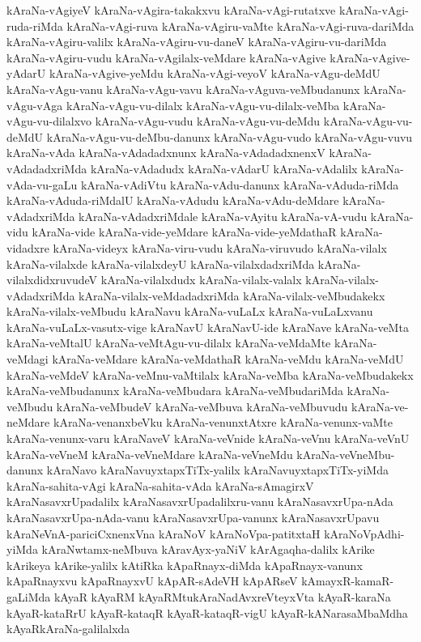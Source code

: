 {kAraNa-vAgiyeV
kAraNa-vAgira-takakxvu
kAraNa-vAgi-rutatxve
kAraNa-vAgi-ruda-riMda
kAraNa-vAgi-ruva
kAraNa-vAgiru-vaMte
kAraNa-vAgi-ruva-dariMda
kAraNa-vAgiru-valilx
kAraNa-vAgiru-vu-daneV
kAraNa-vAgiru-vu-dariMda
kAraNa-vAgiru-vudu
kAraNa-vAgilalx-veMdare
kAraNa-vAgive
kAraNa-vAgive-yAdarU
kAraNa-vAgive-yeMdu
kAraNa-vAgi-veyoV
kAraNa-vAgu-deMdU
kAraNa-vAgu-vanu
kAraNa-vAgu-vavu
kAraNa-vAguva-veMbudanunx
kAraNa-vAgu-vAga
kAraNa-vAgu-vu-dilalx
kAraNa-vAgu-vu-dilalx-veMba
kAraNa-vAgu-vu-dilalxvo
kAraNa-vAgu-vudu
kAraNa-vAgu-vu-deMdu
kAraNa-vAgu-vu-deMdU
kAraNa-vAgu-vu-deMbu-danunx
kAraNa-vAgu-vudo
kAraNa-vAgu-vuvu
kAraNa-vAda
kAraNa-vAdadadxnunx
kAraNa-vAdadadxnenxV
kAraNa-vAdadadxriMda
kAraNa-vAdadudx
kAraNa-vAdarU
kAraNa-vAdalilx
kAraNa-vAda-vu-gaLu
kAraNa-vAdiVtu
kAraNa-vAdu-danunx
kAraNa-vAduda-riMda
kAraNa-vAduda-riMdalU
kAraNa-vAdudu
kAraNa-vAdu-deMdare
kAraNa-vAdadxriMda
kAraNa-vAdadxriMdale
kAraNa-vAyitu
kAraNa-vA-vudu
kAraNa-vidu
kAraNa-vide
kAraNa-vide-yeMdare
kAraNa-vide-yeMdathaR
kAraNa-vidadxre
kAraNa-videyx
kAraNa-viru-vudu
kAraNa-viruvudo
kAraNa-vilalx
kAraNa-vilalxde
kAraNa-vilalxdeyU
kAraNa-vilalxdadxriMda
kAraNa-vilalxdidxruvudeV
kAraNa-vilalxdudx
kAraNa-vilalx-valalx
kAraNa-vilalx-vAdadxriMda
kAraNa-vilalx-veMdadadxriMda
kAraNa-vilalx-veMbudakekx
kAraNa-vilalx-veMbudu
kAraNavu
kAraNa-vuLaLx
kAraNa-vuLaLxvanu
kAraNa-vuLaLx-vasutx-vige
kAraNavU
kAraNavU-ide
kAraNave
kAraNa-veMta
kAraNa-veMtalU
kAraNa-veMtAgu-vu-dilalx
kAraNa-veMdaMte
kAraNa-veMdagi
kAraNa-veMdare
kAraNa-veMdathaR
kAraNa-veMdu
kAraNa-veMdU
kAraNa-veMdeV
kAraNa-veMnu-vaMtilalx
kAraNa-veMba
kAraNa-veMbudakekx
kAraNa-veMbudanunx
kAraNa-veMbudara
kAraNa-veMbudariMda
kAraNa-veMbudu
kAraNa-veMbudeV
kAraNa-veMbuva
kAraNa-veMbuvudu
kAraNa-ve-neMdare
kAraNa-venanxbeVku
kAraNa-venunxtAtxre
kAraNa-venunx-vaMte
kAraNa-venunx-varu
kAraNaveV
kAraNa-veVnide
kAraNa-veVnu
kAraNa-veVnU
kAraNa-veVneM
kAraNa-veVneMdare
kAraNa-veVneMdu
kAraNa-veVneMbu-danunx
kAraNavo
kAraNavuyxtapxTiTx-yalilx
kAraNavuyxtapxTiTx-yiMda
kAraNa-sahita-vAgi
kAraNa-sahita-vAda
kAraNa-sAmagirxV
kAraNasavxrUpadalilx
kAraNasavxrUpadalilxru-vanu
kAraNasavxrUpa-nAda
kAraNasavxrUpa-nAda-vanu
kAraNasavxrUpa-vanunx
kAraNasavxrUpavu
kAraNeVnA-pariciCxnenxVna
kAraNoV
kAraNoVpa-patitxtaH
kAraNoVpAdhi-yiMda
kAraNwtamx-neMbuva
kAravAyx-yaNiV
kArAgaqha-dalilx
kArike
kArikeya
kArike-yalilx
kAtiRka
kApaRnayx-diMda
kApaRnayx-vanunx
kApaRnayxvu
kApaRnayxvU
kApAR-sAdeVH
kApARseV
kAmayxR-kamaR-gaLiMda
kAyaR
kAyaRM
kAyaRMtukAraNadAvxreVteyxVta
kAyaR-karaNa
kAyaR-kataRrU
kAyaR-kataqR
kAyaR-kataqR-vigU
kAyaR-kANarasaMbaMdha
kAyaRkAraNa-galilalxda
}
